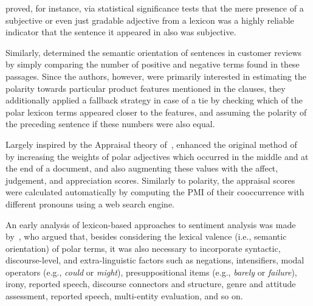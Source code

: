 \citet{Hatzivassi:00} proved, for instance, via statistical
significance tests that the mere presence of a subjective or even just
gradable adjective from a lexicon was a highly reliable indicator that
the sentence it appeared in also was subjective.

Similarly, \citet{Hu:04} determined the semantic orientation of
sentences in customer reviews by simply comparing the number of
positive and negative terms found in these passages. Since the
authors, however, were primarily interested in estimating the polarity
towards particular product features mentioned in the clauses, they
additionally applied a fallback strategy in case of a tie by checking
which of the polar lexicon terms appeared closer to the features, and
assuming the polarity of the preceding sentence if these numbers were
also equal.

Largely inspired by the Appraisal theory of~\citet{Martin:00},
\citet{Taboada:04} enhanced the original method of~\citet{Turney:02}
by increasing the weights of polar adjectives which occurred in the
middle and at the end of a document, and also augmenting these values
with the affect, judgement, and appreciation scores.  Similarly to
polarity, the appraisal scores were calculated automatically by
computing the PMI of their cooccurrence with different pronouns using
a web search engine.

An early analysis of lexicon-based approaches to sentiment analysis
was made by~\citet{Polanyi:06}, who argued that, besides considering
the lexical valence (i.e., semantic orientation) of polar terms, it
was also necessary to incorporate syntactic, discourse-level, and
extra-linguistic factors such as negations, intensifiers, modal
operators (e.g., \emph{could} or \emph{might}), presuppositional items
(e.g., \emph{barely} or \emph{failure}), irony, reported speech,
discourse connectors and structure, genre and attitude assessment,
reported speech, multi-entity evaluation, and so on.

